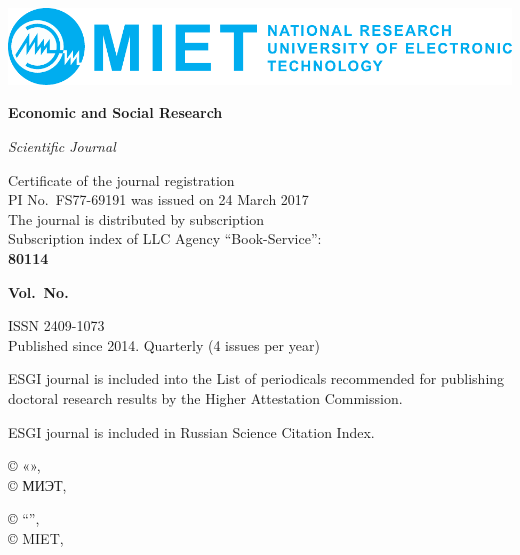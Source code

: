 \begin{center}
  \includegraphics[width=\textwidth]{logo-en}

  {\fontsize{16pt}{20pt}\selectfont\bfseries Economic and Social Research \par}

  {\itshape Scientific Journal}
\end{center}

\noindent
\begin{minipage}{.5\textwidth}
  \small
  Certificate of the journal registration\\
  PI No. FS77-69191 was issued on 24 March 2017\\
  The journal is distributed by subscription\\
  Subscription index of LLC Agency ``Book-Service'':\\
\textbf{80114}
\end{minipage}%
\begin{minipage}{.5\textwidth}
\begin{flushright}
  {\fontsize{16pt}{20pt}\selectfont\bfseries Vol.\, \esgiVol{} No.\, \esgiNum{}
  \esgiYear \par}

  \vspace{5mm}
  \small
  ISSN 2409-1073\\
  Published since 2014. Quarterly (4 issues per year)
\end{flushright}
\end{minipage}

\begin{flushleft}
  \small
  ESGI journal is included into the List of periodicals recommended for publishing doctoral research results by
  the Higher Attestation Commission.

  \vspace{5mm}
  ESGI journal is included in Russian Science Citation Index.
\end{flushleft}

\vfill

\noindent\hrulefill

\noindent
\begin{minipage}{.6\textwidth}
\begin{flushleft}
  \scriptsize
  © «\esgiName{}», \esgiYear\\
  © МИЭТ, \esgiYear
\end{flushleft}
\end{minipage}%
\begin{minipage}{.4\textwidth}
\begin{flushright}
  \scriptsize
  © ``\esgiNameEn{}'', \esgiYear\\
  © MIET, \esgiYear
\end{flushright}
\end{minipage}

\clearpage